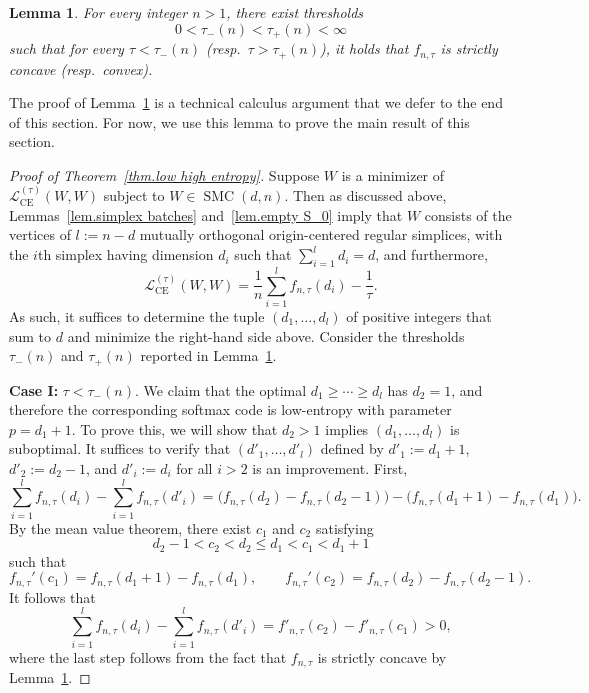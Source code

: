 \documentclass{article}
\theoremstyle{plain}
\newtheorem{lemma}[theorem]{Lemma}
\theoremstyle{definition}
\begin{document}
\begin{lemma}
\label{lem.concave-convex}
For every integer $n>1$, there exist thresholds 
\[
0
<\tau_-(n)
<\tau_+(n)
<\infty
\]
such that for every $\tau<\tau_-(n)$ (resp.\ $\tau>\tau_+(n)$), it holds that $f_{n,\tau}$ is strictly concave (resp.\ convex).
\end{lemma}

The proof of Lemma~\ref{lem.concave-convex} is a technical calculus argument that we defer to the end of this section.
For now, we use this lemma to prove the main result of this section.

\begin{proof}[Proof of Theorem~\ref{thm.low high entropy}]
Suppose $W$ is a minimizer of $\mathcal{L}_{\operatorname{CE}}^{(\tau)}(W,W)$ subject to $W\in\operatorname{SMC}(d,n)$.
Then as discussed above, Lemmas~\ref{lem.simplex batches} and~\ref{lem.empty S_0} imply that $W$ consists of the vertices of $l:=n-d$ mutually orthogonal origin-centered regular simplices, with the $i$th simplex having dimension $d_i$ such that $\sum_{i=1}^l d_i=d$, and furthermore,
\[
\mathcal{L}_{\operatorname{CE}}^{(\tau)}(W,W)
=\frac{1}{n}\sum_{i=1}^{l}f_{n,\tau}(d_i)-\frac{1}{\tau}.
\]
As such, it suffices to determine the tuple $(d_1,\ldots,d_l)$ of positive integers that sum to $d$ and minimize the right-hand side above.
Consider the thresholds $\tau_-(n)$ and $\tau_+(n)$ reported in Lemma~\ref{lem.concave-convex}.

\medskip
\noindent
\textbf{Case I:} $\tau<\tau_-(n)$.
We claim that the optimal $d_1\geq\cdots\geq d_l$ has $d_2=1$, and therefore the corresponding softmax code is low-entropy with parameter $p=d_1+1$.
To prove this, we will show that $d_2>1$ implies $(d_1,\ldots,d_l)$ is suboptimal.
It suffices to verify that $(d'_1,\ldots,d'_l)$ defined by $d'_1:=d_1+1$, $d'_2:=d_2-1$, and $d'_i:=d_i$ for all $i>2$ is an improvement.
First,
\[
\sum_{i=1}^l f_{n,\tau}(d_i) - \sum_{i=1}^l f_{n,\tau}(d'_i)
=\big(f_{n,\tau}(d_2)-f_{n,\tau}(d_2-1)\big)-\big(f_{n,\tau}(d_1+1)-f_{n,\tau}(d_1)\big).
\]
By the mean value theorem, there exist $c_1$ and $c_2$ satisfying
\[
d_2-1
< c_2
< d_2
\leq d_1
< c_1
< d_1+1
\]
such that 
\[
f_{n,\tau}'(c_1)=f_{n,\tau}(d_1+1)-f_{n,\tau}(d_1),
\qquad
f_{n,\tau}'(c_2)=f_{n,\tau}(d_2)-f_{n,\tau}(d_2-1).
\]
It follows that
\[
\sum_{i=1}^l f_{n,\tau}(d_i) - \sum_{i=1}^l f_{n,\tau}(d'_i)
=f'_{n,\tau}(c_2) - f'_{n,\tau}(c_1)
>0,
\]
where the last step follows from the fact that $f_{n,\tau}$ is strictly concave by Lemma~\ref{lem.concave-convex}.


\end{proof}
\end{document}
